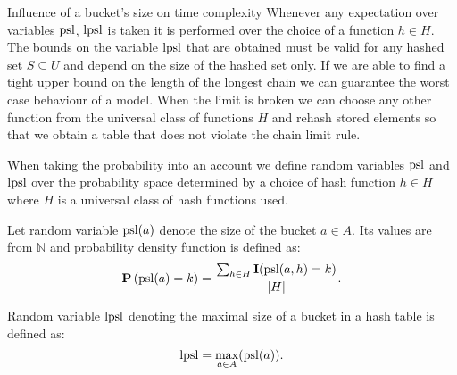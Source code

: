 \begin{section}{Influence of a bucket's size on time complexity}
Whenever any expectation over variables $\mathrm{psl}$, $\mathrm{lpsl}$ is taken it is performed over the choice of a function $h \in H$. The bounds on the variable $\mathrm{lpsl}$ that are obtained must be valid for any hashed set $S \subseteq U$ and depend on the size of the hashed set only. If we are able to find a tight upper bound on the length of the longest chain we can guarantee the worst case behaviour of a model. When the limit is broken we can choose any other function from the universal class of functions $H$ and rehash stored elements so that we obtain a table that does not violate the chain limit rule.

When taking the probability into an account we define random variables $\mathrm{psl}$ and $\mathrm{lpsl}$ over the probability space determined by a choice of hash function $h \in H$ where $H$ is a universal class of hash functions used.

\begin{definition}
Let random variable $\mathrm{psl}(a)$ denote the size of the bucket $a \in A$. Its values are from $\mathbb{N}$ and probability density function is defined as:
\[
\mathbf{P}\left(\mathrm{psl}(a) = k\right) = \frac{\sum_{h \in H} \mathbf{I}(\mathrm{psl}(a, h) = k)}{|H|}\text{.}
\]

Random variable $\mathrm{lpsl}$ denoting the maximal size of a bucket in a hash table is defined as:
\[
\mathrm{lpsl} = \displaystyle\max_{a \in A}(\mathrm{psl}(a))\text{.}
\]
\end{definition}
\end{section}


